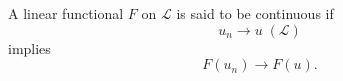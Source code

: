 A linear functional $F$ on $\mathcal{L}$ is said to be continuous if
$$u_n \rightarrow u \; (\mathcal{L})$$
implies
$$F(u_n) \rightarrow F(u).$$
